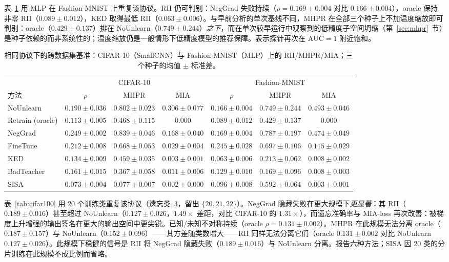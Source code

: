 表~\ref{tab:cross} 用 MLP 在 Fashion-MNIST 上重复该协议。RII 仍可判别：NegGrad 失败持续（$\rho{=}0.169{\pm}0.004$ 对比 $0.166{\pm}0.004$），oracle 保持非零 RII（$0.089{\pm}0.012$），KED 取得最低 RII（$0.063{\pm}0.006$）。与早前分析的单次基线不同，MHPR 在全部三个种子上不加温度缩放即可判别：oracle（$0.429{\pm}0.137$）排在 NoUnlearn（$0.749{\pm}0.244$）\emph{之下}，而在单次较早运行中观察到的低精度子空间坍缩（第~\ref{sec:mhpr}~节）是种子依赖的而非系统性的；温度缩放仍是一般情形下低精度模型的推荐保障。表示探针再次在 $\mathrm{AUC}{=}1$ 附近饱和。

\begin{table}[t]
\centering
\small
\caption{相同协议下的跨数据集基准：CIFAR-10（SmallCNN）与 Fashion-MNIST（MLP）上的 RII/MHPR/MIA；三个种子的均值 $\pm$ 标准差。}\label{tab:cross}
\setlength{\tabcolsep}{2pt}
\footnotesize
\begin{tabular}{l c c c | c c c}
\toprule
 & \multicolumn{3}{c|}{CIFAR-10} & \multicolumn{3}{c}{Fashion-MNIST} \\
方法 & $\rho$ & MHPR & MIA & $\rho$ & MHPR & MIA \\
\midrule
NoUnlearn & $0.190{\pm}0.036$ & $0.802{\pm}0.023$ & $0.306{\pm}0.077$ & $0.166{\pm}0.004$ & $0.749{\pm}0.244$ & $0.493{\pm}0.046$ \\
Retrain (oracle) & $0.113{\pm}0.005$ & $0.468{\pm}0.115$ & 0.000 & $0.089{\pm}0.012$ & $0.429{\pm}0.137$ & 0.000 \\
NegGrad & $\mathbf{0.249{\pm}0.002}$ & $0.839{\pm}0.046$ & $0.168{\pm}0.040$ & $0.169{\pm}0.004$ & $0.787{\pm}0.197$ & $0.474{\pm}0.049$ \\
FineTune & $0.212{\pm}0.008$ & $0.668{\pm}0.053$ & $0.029{\pm}0.004$ & $0.245{\pm}0.028$ & $0.697{\pm}0.106$ & $0.115{\pm}0.029$ \\
KED & $0.134{\pm}0.009$ & $0.459{\pm}0.035$ & $0.003{\pm}0.001$ & $\mathbf{0.063{\pm}0.006}$ & $0.213{\pm}0.062$ & $0.008{\pm}0.002$ \\
BadTeacher & $0.161{\pm}0.015$ & $0.367{\pm}0.058$ & $0.011{\pm}0.006$ & $0.129{\pm}0.010$ & $0.169{\pm}0.096$ & $0.008{\pm}0.003$ \\
SISA & $0.073{\pm}0.004$ & $0.077{\pm}0.007$ & $0.002{\pm}0.000$ & $0.096{\pm}0.008$ & $0.592{\pm}0.064$ & $0.003{\pm}0.001$ \\
\bottomrule
\end{tabular}
\end{table}

表~\ref{tab:cifar100} 用 20 个训练类重复该协议（遗忘类~3，留出 $\{20,21,22\}$）。NegGrad 隐藏失败在更大规模下\emph{更显著}：其 RII（$0.189{\pm}0.016$）甚至超过 NoUnlearn（$0.127{\pm}0.026$，$1.49\times$ 差距，对比 CIFAR-10 的 $1.31\times$），而遗忘准确率与 MIA-loss 再次改善：被梯度上升增强的输出签名在更大的输出空间中更尖锐。已知/未知不对称持续（oracle $\rho{=}0.131{\pm}0.002$）。MHPR 在此规模无法分离 oracle（$0.187{\pm}0.157$）与 NoUnlearn（$0.152{\pm}0.096$）——其方差随类数增大——RII 同样无法分离它们（oracle $0.131{\pm}0.002$ 对比 NoUnlearn $0.127{\pm}0.026$）。此规模下稳健的信号是 RII 将 NegGrad 隐藏失败（$0.189{\pm}0.016$）与 NoUnlearn 分离。报告六种方法；SISA 因 20 类的分片训练在此规模不成比例而省略。

